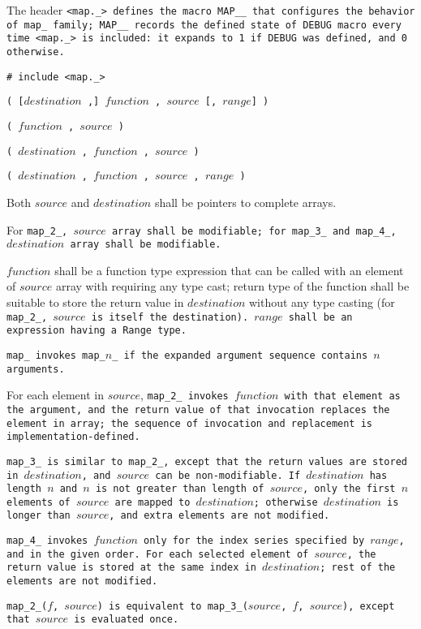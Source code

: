 The header \tt{<map._>} defines the macro \tt{MAP__} that configures
the behavior of \tt{map_} family; \tt{MAP__} records the \tt{defined}
state of \tt{DEBUG} macro every time \tt{<map._>} is included:
it expands to \tt{1} if \tt{DEBUG} was defined, and \tt{0} otherwise.


\tt{# include <map._>}

\s\s\s\tt{(} [$destination$ \tt{,}]
$function$ \tt{,} $source$ [\tt{,} $range$] \tt{)}

\s\tt{(} $function$ \tt{,} $source$ \tt{)}

\s\tt{(} \phantom{[}$destination$ \tt{,}\phantom{]}
$function$ \tt{,} $source$ \tt{)}

\s\tt{(} \phantom{[}$destination$ \tt{,}\phantom{]}
$function$ \tt{,} $source$ \phantom{[}\tt{,} $range$\phantom{]} \tt{)}


Both $source$ and $destination$ shall be pointers to complete arrays.

For \tt{map_2_}, $source$ array shall be modifiable;
for \tt{map_3_} and \tt{map_4_}, $destination$ array shall be modifiable.

$function$ shall be a function type expression that can be called with an
element of $source$ array with requiring any type cast; return type of the
function shall be suitable to store the return value in $destination$ without
any type casting (for \tt{map_2_}, $source$ is itself the destination).
$range$ shall be an expression having a \tt{Range} type.


\tt{map_} invokes \tt{map_}$n$\_ if the
expanded argument sequence contains $n$ arguments.

For each element in $source$, \tt{map_2_} invokes $function$ with that element
as the argument, and the return value of that invocation replaces the element
in array; the sequence of invocation and replacement is implementation-defined.

\tt{map_3_} is similar to \tt{map_2_}, except that the return values
are stored in $destination$, and $source$ can be non-modifiable.
If $destination$ has length $n$ and $n$ is not greater than length of $source$,
only the first $n$ elements of $source$ are mapped to $destination$; otherwise
$destination$ is longer than $source$, and extra elements are not modified.

\tt{map_4_} invokes $function$ only for the index
series specified by $range$, and in the given order.
For each selected element of $source$, the return value is stored at
the same index in $destination$; rest of the elements are not modified.

\note \tt{map_2_(}$f$\tt{,} $source$\tt{)} is equivalent
to \tt{map_3_(}$source$\tt{,} $f$\tt{,} $source$\tt{)},
except that $source$ is evaluated once.
